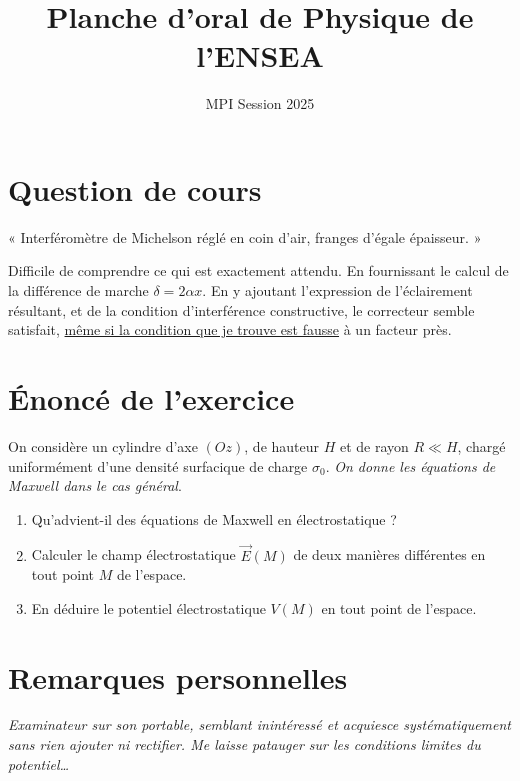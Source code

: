 \documentclass[11pt]{article}
\title{Planche d'oral de Physique de l’ENSEA}
\author{MPI Session 2025}
\date{}
\begin{document}
\maketitle

\section*{Question de cours}

« Interféromètre de Michelson réglé en coin d'air, franges d'égale épaisseur. »

Difficile de comprendre ce qui est exactement attendu. En fournissant le calcul de la différence de marche $\delta = 2\alpha x $. En y ajoutant l'expression de l'éclairement résultant, et de la condition d'interférence constructive, le correcteur semble satisfait, \underline{même si la condition que je trouve est fausse} à un facteur près.

\section*{Énoncé de l'exercice}
On considère un cylindre d'axe $(Oz)$, de hauteur $H$ et de rayon $R\ll H $, chargé uniformément d'une densité surfacique de charge $\sigma_0$. \textit{On donne les équations de Maxwell dans le cas général}.
\begin{enumerate}[label=\textbf{\arabic*.}]
    \item Qu'advient-il des équations de Maxwell en électrostatique ?
    \item Calculer le champ électrostatique $\vec{E}(M)$ de deux manières différentes en tout point $M$ de l'espace.
    \item En déduire le potentiel électrostatique $V(M)$ en tout point de l'espace.
\end{enumerate}

\vspace{1cm}

\section*{Remarques personnelles}
\textit{Examinateur sur son portable, semblant inintéressé et acquiesce systématiquement sans rien ajouter ni rectifier. Me laisse patauger sur les conditions limites du potentiel\dots}
\end{document}
